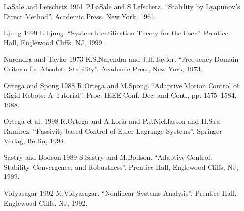 \documentclass[UTF8,12pt,a4paper]{ctexart}
\theoremstyle{definition}
\begin{document}
\begin{enumerate}
\item [LaSale and Lefschetz 1961] P.LaSale and S.Lefschetz. ``Stability by Lyapunov's Direct Method''. Academic Press, New York, 1961.

\item [Ljung 1999] L.Ljung. ``System Identification-Theory for the User''. Prentice-Hall, Englewood Cliffs, NJ, 1999.

\item [Narendra and Taylor 1973] K.S.Narendra and J.H.Taylor. ``Frequency Domain Criteria for Absolute Stability''. Academic Press, New York, 1973.

\item [Ortega and Spong 1988] R.Ortega and M.Spong. ``Adaptive Motion Control of Rigid Robots: A Tutorial''. Proc. IEEE Conf. Dec. and Cont., pp. 1575--1584, 1988.

\item [Ortega et al. 1998] R.Ortega and A.Loria and P.J.Nicklasson and H.Sira-Ramirez. ``Passivity-based Control of Euler-Lagrange Systems''. Springer-Verlag, Berlin, 1998.

\item [Sastry and Bodson 1989] S.Sastry and M.Bodson. ``Adaptive Control: Stability, Convergence, and Robustness''. Prentice-Hall, Englewood Cliffs, NJ, 1989.

\item [Vidyasagar 1992] M.Vidyasagar. ``Nonlinear Systems Analysis''. Prentice-Hall, Englewood Cliffs, NJ, 1992.
\end{enumerate}

\ifstandalone
  
\end{document}
